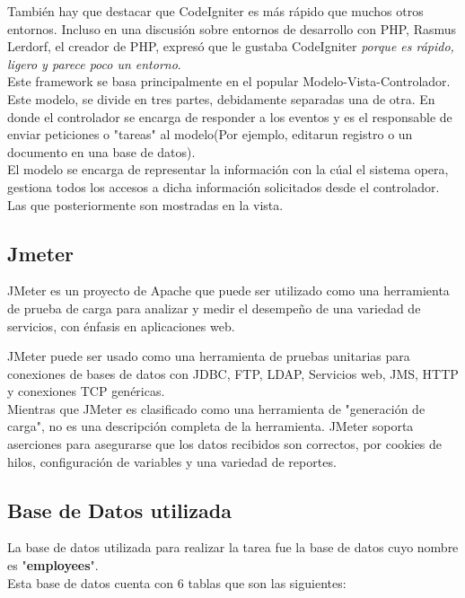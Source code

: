 También hay que destacar que CodeIgniter es más rápido que muchos otros entornos. Incluso en una discusión sobre entornos de desarrollo con PHP, Rasmus Lerdorf, el creador de PHP, expresó que le gustaba CodeIgniter \textit{porque es rápido, ligero y parece poco un entorno}.\\

Este framework se basa principalmente en el popular Modelo-Vista-Controlador. Este modelo, se divide en tres partes, debidamente separadas una de otra. En donde el controlador se encarga de responder a los eventos y es el responsable de enviar peticiones o "tareas" al modelo(Por ejemplo, editarun registro o un documento en una base de datos).\\
El modelo se encarga de representar la información con la cúal el sistema opera,  gestiona todos los accesos a dicha información solicitados desde el controlador. Las que posteriormente son mostradas en la vista. 

\subsection{Jmeter}

JMeter es un proyecto de Apache que puede ser utilizado como una herramienta de prueba de carga para analizar y medir el desempeño de una variedad de servicios, con énfasis en aplicaciones web.

\clearpage
\newpage

JMeter puede ser usado como una herramienta de pruebas unitarias para conexiones de bases de datos con JDBC, FTP, LDAP, Servicios web, JMS, HTTP y conexiones TCP genéricas. \\

Mientras que JMeter es clasificado como una herramienta de "generación de carga", no es una descripción completa de la herramienta. JMeter soporta aserciones para asegurarse que los datos recibidos son correctos, por cookies de hilos, configuración de variables y una variedad de reportes.\\


\subsection{Base de Datos utilizada}

La base de datos utilizada para realizar la tarea fue la base de datos cuyo nombre es "\textbf{employees}".\\

Esta base de datos cuenta con 6 tablas que son las siguientes:

